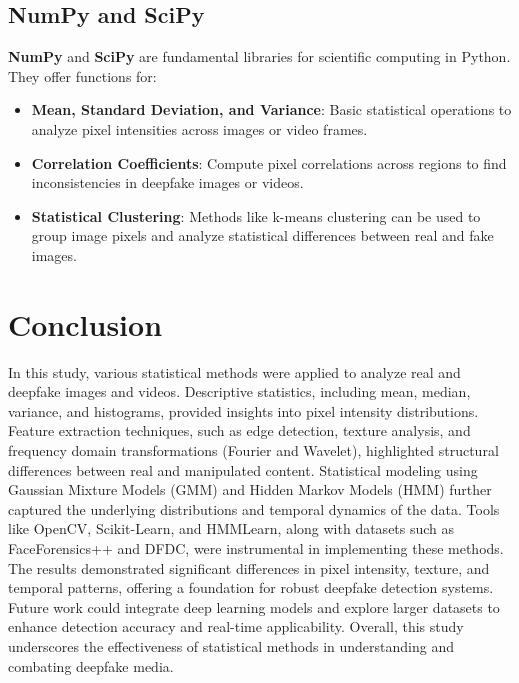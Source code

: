\documentclass{article}
\begin{document}
\subsection{NumPy and SciPy}
\textbf{NumPy} and \textbf{SciPy} are fundamental libraries for scientific computing in Python. They offer functions for:
\begin{itemize}
    \item \textbf{Mean, Standard Deviation, and Variance}: Basic statistical operations to analyze pixel intensities across images or video frames.
    \item \textbf{Correlation Coefficients}: Compute pixel correlations across regions to find inconsistencies in deepfake images or videos.
    \item \textbf{Statistical Clustering}: Methods like k-means clustering can be used to group image pixels and analyze statistical differences between real and fake images.
\end{itemize}

\section*{Conclusion}
In this study, various statistical methods were applied to analyze real and deepfake images and videos. Descriptive statistics, including mean, median, variance, and histograms, provided insights into pixel intensity distributions. Feature extraction techniques, such as edge detection, texture analysis, and frequency domain transformations (Fourier and Wavelet), highlighted structural differences between real and manipulated content. Statistical modeling using Gaussian Mixture Models (GMM) and Hidden Markov Models (HMM) further captured the underlying distributions and temporal dynamics of the data. Tools like OpenCV, Scikit-Learn, and HMMLearn, along with datasets such as FaceForensics++ and DFDC, were instrumental in implementing these methods. The results demonstrated significant differences in pixel intensity, texture, and temporal patterns, offering a foundation for robust deepfake detection systems. Future work could integrate deep learning models and explore larger datasets to enhance detection accuracy and real-time applicability. Overall, this study underscores the effectiveness of statistical methods in understanding and combating deepfake media.
\end{document}
